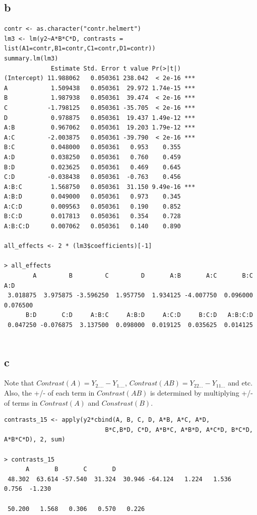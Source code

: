 \documentclass[11pt,letterpaper]{article}
\begin{document}
\subsection*{b}
\begin{verbatim}
contr <- as.character("contr.helmert")
lm3 <- lm(y2~A*B*C*D, contrasts = list(A1=contr,B1=contr,C1=contr,D1=contr))
summary.lm(lm3) 
             Estimate Std. Error t value Pr(>|t|)    
(Intercept) 11.988062   0.050361 238.042  < 2e-16 ***
A            1.509438   0.050361  29.972 1.74e-15 ***
B            1.987938   0.050361  39.474  < 2e-16 ***
C           -1.798125   0.050361 -35.705  < 2e-16 ***
D            0.978875   0.050361  19.437 1.49e-12 ***
A:B          0.967062   0.050361  19.203 1.79e-12 ***
A:C         -2.003875   0.050361 -39.790  < 2e-16 ***
B:C          0.048000   0.050361   0.953    0.355    
A:D          0.038250   0.050361   0.760    0.459    
B:D          0.023625   0.050361   0.469    0.645    
C:D         -0.038438   0.050361  -0.763    0.456    
A:B:C        1.568750   0.050361  31.150 9.49e-16 ***
A:B:D        0.049000   0.050361   0.973    0.345    
A:C:D        0.009563   0.050361   0.190    0.852    
B:C:D        0.017813   0.050361   0.354    0.728    
A:B:C:D      0.007062   0.050361   0.140    0.890  

all_effects <- 2 * (lm3$coefficients)[-1]

> all_effects
        A         B         C         D       A:B       A:C       B:C       A:D 
 3.018875  3.975875 -3.596250  1.957750  1.934125 -4.007750  0.096000  0.076500 
      B:D       C:D     A:B:C     A:B:D     A:C:D     B:C:D   A:B:C:D 
 0.047250 -0.076875  3.137500  0.098000  0.019125  0.035625  0.014125 
 
\end{verbatim}

\subsection*{c}
\noindent Note that $Contrast(A) = Y_{2....} - Y_{1....}$, $Contrast(AB) = Y_{22...} - Y_{11...}$ and etc. Also, the +/- of each term in $Contrast(AB)$ is determined by multiplying +/- of terms in $Contrast(A)$ and $Constrast(B)$.

\begin{verbatim}
contrasts_15 <- apply(y2*cbind(A, B, C, D, A*B, A*C, A*D,
                            B*C,B*D, C*D, A*B*C, A*B*D, A*C*D, B*C*D, A*B*C*D), 2, sum)

> contrasts_15
      A       B       C       D                                                 
 48.302  63.614 -57.540  31.324  30.946 -64.124   1.224   1.536   0.756  -1.230 
                                        
 50.200   1.568   0.306   0.570   0.226 
\end{verbatim}
\end{document}
